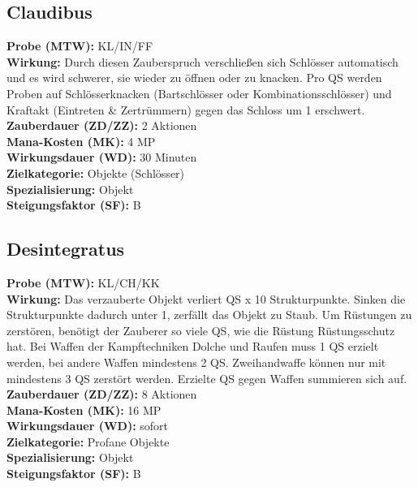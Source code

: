 \subsection{Claudibus}
\label{chap:claudibus}
\textbf{Probe (MTW):} KL/IN/FF \\
\textbf{Wirkung:} Durch diesen Zauberspruch verschließen sich Schlösser automatisch und es wird schwerer, sie wieder zu öffnen oder zu knacken. Pro QS werden Proben auf Schlösserknacken (Bartschlösser oder Kombinationsschlösser) und Kraftakt (Eintreten \& Zertrümmern) gegen das Schloss um 1 erschwert. \\
\textbf{Zauberdauer (ZD/ZZ):} 2 Aktionen \\
\textbf{Mana-Kosten (MK):} 4 MP \\
\textbf{Wirkungsdauer (WD):} 30 Minuten \\
\textbf{Zielkategorie:} Objekte (Schlösser) \\
\textbf{Spezialisierung:} Objekt \\
\textbf{Steigungsfaktor (SF):} B


\subsection{Desintegratus}
\label{chap:desintegratus}
\textbf{Probe (MTW):} KL/CH/KK \\
\textbf{Wirkung:} Das verzauberte Objekt verliert QS x 10 Strukturpunkte. Sinken die Strukturpunkte dadurch unter 1, zerfällt das Objekt zu Staub. Um Rüstungen zu zerstören, benötigt der Zauberer so viele QS, wie die Rüstung Rüstungsschutz hat. Bei Waffen der Kampftechniken Dolche und Raufen muss 1 QS erzielt werden, bei andere Waffen mindestens 2 QS. Zweihandwaffe können nur mit mindestens 3 QS zerstört werden. Erzielte QS gegen Waffen summieren sich auf.\\
\textbf{Zauberdauer (ZD/ZZ):} 8 Aktionen \\
\textbf{Mana-Kosten (MK):} 16 MP \\
\textbf{Wirkungsdauer (WD):} sofort \\
\textbf{Zielkategorie:} Profane Objekte \\
\textbf{Spezialisierung:} Objekt \\
\textbf{Steigungsfaktor (SF):} B


